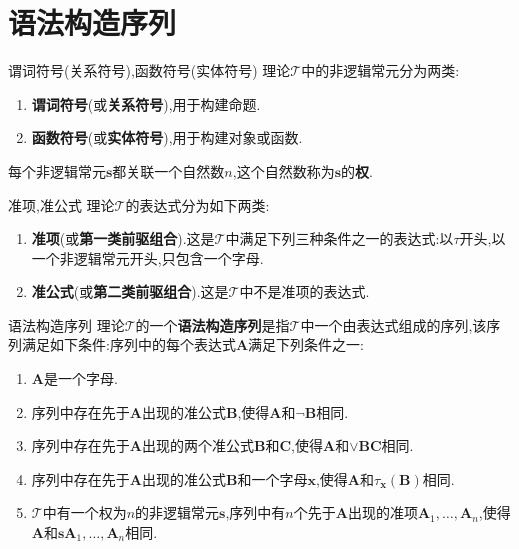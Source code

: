 \section{语法构造序列}

\begin{definition}{谓词符号(关系符号),函数符号(实体符号)}{}
	理论$\mathcal{T}$中的非逻辑常元分为两类:
	\begin{enumerate}
		\item \textbf{谓词符号}(或\textbf{关系符号}),用于构建命题.
		\item \textbf{函数符号}(或\textbf{实体符号}),用于构建对象或函数.
	\end{enumerate}
	每个非逻辑常元$\boldsymbol{s}$都关联一个自然数$n$,这个自然数称为$\boldsymbol{s}$的\textbf{权}.
\end{definition}

\begin{definition}{准项,准公式}{}
	理论$\mathcal{T}$的表达式分为如下两类:
	\begin{enumerate}
		\item \textbf{准项}(或\textbf{第一类前驱组合}).这是$\mathcal{T}$中满足下列三种条件之一的表达式:以$\tau$开头,以一个非逻辑常元开头,只包含一个字母.
		\item \textbf{准公式}(或\textbf{第二类前驱组合}).这是$\mathcal{T}$中不是准项的表达式.
	\end{enumerate}
\end{definition}

\begin{definition}{语法构造序列}{}
	理论$\mathcal{T}$的一个\textbf{语法构造序列}是指$\mathcal{T}$中一个由表达式组成的序列,该序列满足如下条件:序列中的每个表达式$\boldsymbol{A}$满足下列条件之一:
	\begin{enumerate}
		\item $\boldsymbol{A}$是一个字母.
		\item 序列中存在先于$\boldsymbol{A}$出现的准公式$\boldsymbol{B}$,使得$\boldsymbol{A}$和$\neg\boldsymbol{B}$相同.
		\item 序列中存在先于$\boldsymbol{A}$出现的两个准公式$\boldsymbol{B}$和$\boldsymbol{C}$,使得$\boldsymbol{A}$和$\vee\boldsymbol{B}\boldsymbol{C}$相同.
		\item 序列中存在先于$\boldsymbol{A}$出现的准公式$\boldsymbol{B}$和一个字母$\boldsymbol{x}$,使得$\boldsymbol{A}$和$\tau_{\boldsymbol{x}}\left(\boldsymbol{B}\right)$相同.
		\item $\mathcal{T}$中有一个权为$n$的非逻辑常元$\boldsymbol{s}$,序列中有$n$个先于$\boldsymbol{A}$出现的准项$\boldsymbol{A}_{1},\ldots,\boldsymbol{A}_{n}$,使得$\boldsymbol{A}$和$\boldsymbol{s}\boldsymbol{A}_{1},\ldots,\boldsymbol{A}_{n}$相同.
	\end{enumerate}
\end{definition}

